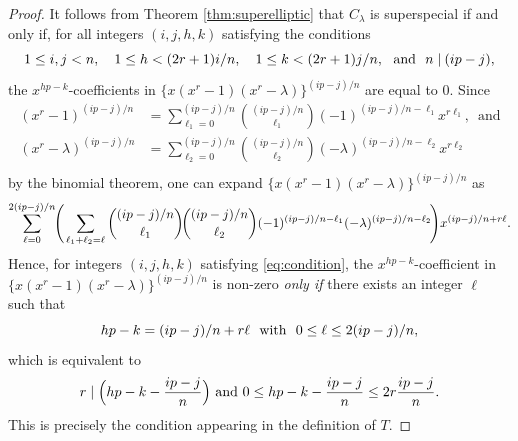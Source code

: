 \documentclass{article}
\theoremstyle{definition}
\begin{document}
\begin{proof}
It follows from Theorem \ref{thm:superelliptic} that $C_\lambda$ is superspecial if and only if, for all integers $(i,j,h,k)$ satisfying the conditions\vspace{-1mm}
\begin{equation}\label{eq:condition}
    1 \leq i,j < n, \quad 1 \leq h < (2r+1)i/n, \quad 1 \leq k < (2r+1)j/n,\ \text{ and }\ n \mid\hspace{-0.2mm} (ip-j),\vspace{0.8mm}
\end{equation}
the $x^{hp-k}$-coefficients in $\{x(x^r-1)(x^r-\lambda)\}^{(ip-j)/n}$ are equal to $0$.
Since\vspace{-0.6mm}
\begin{align*}
    (x^r-1)^{(ip-j)/n} &= \sum_{\ell_1=0}^{(ip-j)/n}\binom{(ip-j)/n}{\ell_1}(-1)^{(ip-j)/n-\ell_1}x^{r\ell_1}, \,\text{ and}\\[-0.3mm]
    (x^r-\lambda)^{(ip-j)/n} &= \sum_{\ell_2=0}^{(ip-j)/n}\binom{(ip-j)/n}{\ell_2}(-\lambda)^{(ip-j)/n-\ell_2}x^{r\ell_2}\\[-5.3mm]
\end{align*}
by the binomial theorem, one can expand $\{x(x^r-1)(x^r-\lambda)\}^{(ip-j)/n}$ as\vspace{-1.5mm}
\begin{equation}\label{eq:expand}
    \sum_{\ell=0}^{2(ip-j)/n}\hspace{-0.4mm}\Biggl(\hspace{0.5mm}\sum_{\ell_1+\ell_2=\ell}\binom{(ip-j)/n}{\ell_1}\!\binom{(ip-j)/n}{\ell_2}(-1)^{(ip-j)/n-\ell_1}(-\lambda)^{(ip-j)/n-\ell_2}\hspace{-0.5mm}\Biggr)x^{(ip-j)/n+r\ell}.\vspace{-0.3mm}
\end{equation}
Hence, for integers $(i,j,h,k)$ satisfying \eqref{eq:condition}, the $x^{hp-k}$-coefficient in $\{x(x^r-1)(x^r-\lambda)\}^{(ip-j)/n}$ is non-zero \emph{only if} there exists an integer $\ell$ such that\vspace{-0.7mm}
\[
    hp-k = (ip-j)/n + r\ell \ \text{ with }\ 0 \leq \ell \leq 2(ip-j)/n,\vspace{-0.3mm}
\]
which is equivalent to\vspace{-1.7mm}
\[
    r \mid \Bigl(hp-k-\frac{ip-j}{n}\Bigr) \text{ and } 0 \leq hp-k-\frac{ip-j}{n} \leq 2r\frac{ip-j}{n}.\vspace{0.4mm}
\]
This is precisely the condition appearing in the definition of $T$.


\end{proof}
\end{document}
